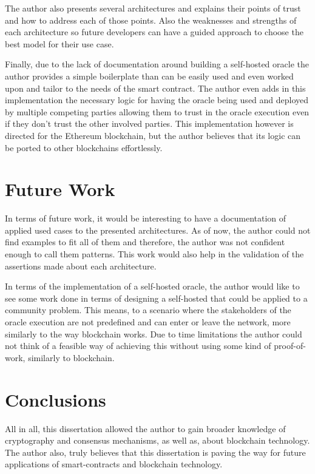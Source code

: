 The author also presents several architectures and explains their points of trust and how to address each of those points. Also the weaknesses and strengths of each architecture so future developers can have a guided approach to choose the best model for their use case.

Finally, due to the lack of documentation around building a self-hosted oracle the author provides a simple boilerplate than can be easily used and even worked upon and tailor to the needs of the smart contract. The author even adds in this implementation the necessary logic for having the oracle being used and deployed by multiple competing parties allowing them to trust in the oracle execution even if they don't trust the other involved parties. This implementation however is directed for the Ethereum blockchain, but the author believes that its logic can be ported to other blockchains effortlessly.

\section{Future Work}

In terms of future work, it would be interesting to have a documentation of applied used cases to the presented architectures. As of now, the author could not find examples to fit all of them and therefore, the author was not confident enough to call them patterns. This work would also help in the validation of the assertions made about each architecture.

In terms of the implementation of a self-hosted oracle, the author would like to see some work done in terms of designing a self-hosted that could be applied to a community problem. This means, to a scenario where the stakeholders of the oracle execution are not predefined and can enter or leave the network, more similarly to the way blockchain works. Due to time limitations the author could not think of a feasible way of achieving this without using some kind of proof-of-work, similarly to blockchain.

\section{Conclusions}

All in all, this dissertation allowed the author to gain broader knowledge of cryptography and consensus mechanisms, as well as, about blockchain technology. The author also, truly believes that this dissertation is paving the way for future applications of smart-contracts and blockchain technology.